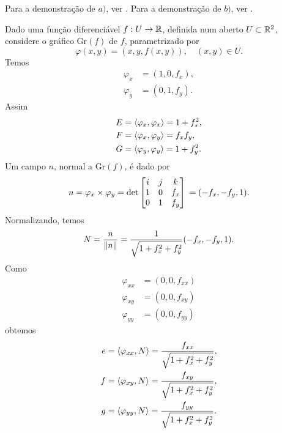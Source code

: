 \begin{demonstracao}
	Para a demonstração de $a)$, ver \cite[§3.5, Exemplo 5]{Carmo2010}. 
	Para a demonstração de $b)$, ver \cite[§3.5, Exemplo 6]{Carmo2010}.
\end{demonstracao}

\begin{exemplo}
	Dado uma função diferenciável $f: U \rightarrow \mathbb{R}$, definida num aberto $U \subset \mathbb{R}^2$, considere o gráfico $\text{Gr}(f)$ de $f$, parametrizado por
	\begin{equation*}
	\varphi(x,y) = (x,y,f(x,y)), \quad (x,y) \in U.
	\end{equation*}
	Temos
	\begin{align*}
	\varphi_x &= (1,0,f_x),\\
	\varphi_y &= (0,1,f_y).
	\end{align*}
	Assim
	\begin{align*}
	E &= \left\langle \varphi_x,\varphi_x \right\rangle = 1 + f_x^2,\\
	F &= \left\langle \varphi_x,\varphi_y \right\rangle = f_x f_y,\\
	G &= \left\langle \varphi_y,\varphi_y \right\rangle = 1 + f_y^2.
	\end{align*}
	Um campo $n$, normal a $\text{Gr}(f)$, é dado por
	\begin{equation*}
	n = \varphi_x \times \varphi_y = \det \left[ \begin{matrix}
	i & j & k\\
	1 & 0 & f_x\\
	0 & 1 & f_y
	\end{matrix} \right]\\
	= (-f_x, -f_y, 1).
	\end{equation*}
	Normalizando, temos
	\begin{equation*}
	N = \frac{n}{\left\| n \right\|} = \frac{1}{\sqrt{1 + f_x^2 + f_y^2}}(-f_x, -f_y, 1).
	\end{equation*}
	Como
	\begin{align*}
	\varphi_{xx} &= (0, 0, f_{xx})\\
	\varphi_{xy} &= (0, 0, f_{xy})\\
	\varphi_{yy} &= (0, 0, f_{yy})
	\end{align*}
	obtemos
	\begin{align*}
	e &= \innerproduct{\varphi_{xx}}{N} = \frac{f_{xx}}{\sqrt{1 + f_x^2 + f_y^2}},\\
	f &= \innerproduct{\varphi_{xy}}{N} = \frac{f_{xy}}{\sqrt{1 + f_x^2 + f_y^2}},\\
	g &= \innerproduct{\varphi_{yy}}{N} = \frac{f_{yy}}{\sqrt{1 + f_x^2 + f_y^2}}.

\end{align*}
\end{exemplo}
